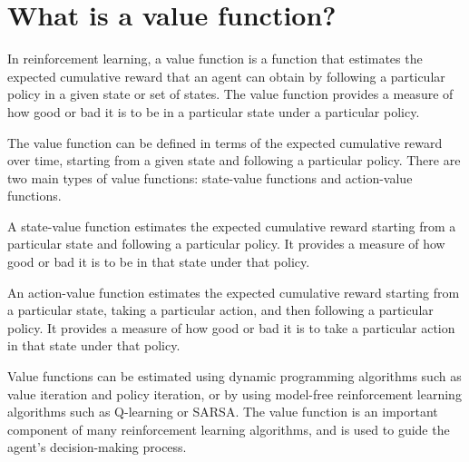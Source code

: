 \section{What is a value function?}
In reinforcement learning, a value function is a function that estimates the expected cumulative reward that an agent can obtain by following a particular policy in a given state or set of states. The value function provides a measure of how good or bad it is to be in a particular state under a particular policy.

The value function can be defined in terms of the expected cumulative reward over time, starting from a given state and following a particular policy. There are two main types of value functions: state-value functions and action-value functions.

A state-value function estimates the expected cumulative reward starting from a particular state and following a particular policy. It provides a measure of how good or bad it is to be in that state under that policy.

An action-value function estimates the expected cumulative reward starting from a particular state, taking a particular action, and then following a particular policy. It provides a measure of how good or bad it is to take a particular action in that state under that policy.

Value functions can be estimated using dynamic programming algorithms such as value iteration and policy iteration, or by using model-free reinforcement learning algorithms such as Q-learning or SARSA. The value function is an important component of many reinforcement learning algorithms, and is used to guide the agent's decision-making process.

